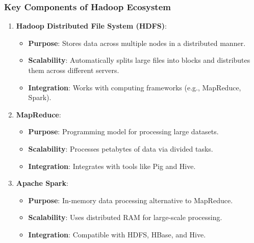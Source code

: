 \documentclass[aspectratio=169]{beamer}
\begin{document}
\begin{frame}[fragile]
    \frametitle{Key Components of Hadoop Ecosystem}
    \begin{enumerate}
        \item \textbf{Hadoop Distributed File System (HDFS)}:
            \begin{itemize}
                \item \textbf{Purpose}: Stores data across multiple nodes in a distributed manner.
                \item \textbf{Scalability}: Automatically splits large files into blocks and distributes them across different servers.
                \item \textbf{Integration}: Works with computing frameworks (e.g., MapReduce, Spark).
            \end{itemize}

        \item \textbf{MapReduce}:
            \begin{itemize}
                \item \textbf{Purpose}: Programming model for processing large datasets.
                \item \textbf{Scalability}: Processes petabytes of data via divided tasks.
                \item \textbf{Integration}: Integrates with tools like Pig and Hive.
            \end{itemize}

        \item \textbf{Apache Spark}:
            \begin{itemize}
                \item \textbf{Purpose}: In-memory data processing alternative to MapReduce.
                \item \textbf{Scalability}: Uses distributed RAM for large-scale processing.
                \item \textbf{Integration}: Compatible with HDFS, HBase, and Hive.
            \end{itemize}
    \end{enumerate}
\end{frame}
\end{document}
